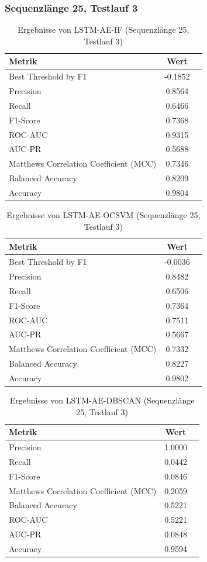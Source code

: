 \documentclass[a4paper,12pt]{article}
\begin{document}
\subsubsection{Sequenzlänge 25, Testlauf 3}
\begin{table}[H]
	\centering
	\caption{Ergebnisse von LSTM-AE-IF (Sequenzlänge 25, Testlauf 3)}
	\begin{tabular}{lcc}
		\hline
		Metrik & Wert \\
		\hline
		Best Threshold by F1 & -0.1852 \\
		Precision & 0.8564 \\
		Recall & 0.6466 \\
		F1-Score & 0.7368 \\
		ROC-AUC & 0.9315 \\
		AUC-PR & 0.5688 \\
		Matthews Correlation Coefficient (MCC) & 0.7346 \\
		Balanced Accuracy & 0.8209 \\
		Accuracy & 0.9804 \\
		\hline
	\end{tabular}
\end{table}

\begin{table}[H]
	\centering
	\caption{Ergebnisse von LSTM-AE-OCSVM (Sequenzlänge 25, Testlauf 3)}
	\begin{tabular}{lcc}
		\hline
		Metrik & Wert \\
		\hline
		Best Threshold by F1 & -0.0036 \\
		Precision & 0.8482 \\
		Recall & 0.6506 \\
		F1-Score & 0.7364 \\
		ROC-AUC & 0.7511 \\
		AUC-PR & 0.5667 \\
		Matthews Correlation Coefficient (MCC) & 0.7332 \\
		Balanced Accuracy & 0.8227 \\
		Accuracy & 0.9802 \\
		\hline
	\end{tabular}
\end{table}

\begin{table}[H]
	\centering
	\caption{Ergebnisse von LSTM-AE-DBSCAN (Sequenzlänge 25, Testlauf 3)}
	\begin{tabular}{lcc}
		\hline
		Metrik & Wert \\
		\hline
		Precision & 1.0000 \\
		Recall & 0.0442 \\
		F1-Score & 0.0846 \\
		Matthews Correlation Coefficient (MCC) & 0.2059 \\
		Balanced Accuracy & 0.5221 \\
		ROC-AUC & 0.5221 \\
		AUC-PR & 0.0848 \\
		Accuracy & 0.9594 \\
		\hline
	\end{tabular}
\end{table}
\end{document}
